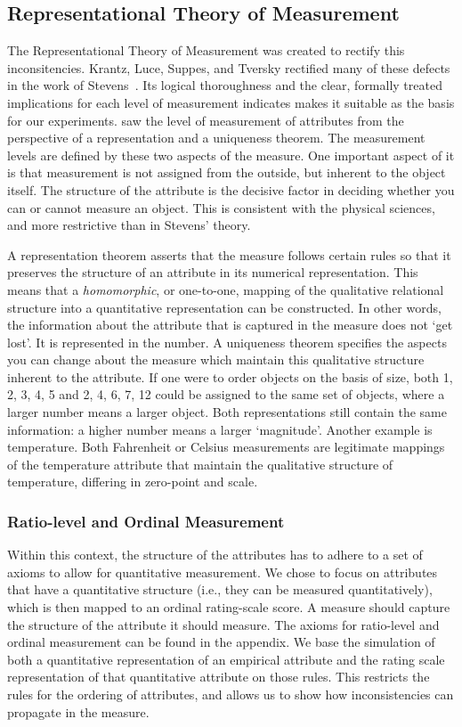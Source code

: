 \documentclass[titlepage, a4paper, 11pt]{article}
\begin{document}
\subsection{Representational Theory of Measurement}
The Representational Theory of Measurement was created to rectify this inconsitencies.
Krantz, Luce, Suppes, and Tversky rectified many of these defects in the work of Stevens~\citep{krantz_foundations_1971, luce_quantification_1997}. Its logical thoroughness and the clear, formally treated implications for each level of measurement indicates makes it suitable as the basis for our experiments. \citet{krantz_foundations_1971} saw the level of measurement of attributes from the perspective of a representation and a uniqueness theorem. The measurement levels are defined by these two aspects of the measure. One important aspect of it is that measurement is not assigned from the outside, but inherent to the object itself. The structure of the attribute is the decisive factor in deciding whether you can or cannot measure an object. This is consistent with the physical sciences, and more restrictive than in Stevens' theory.
 
A representation theorem asserts that the measure follows certain rules so that it preserves the structure of an attribute in its numerical representation. This means that a \textit{homomorphic}, or one-to-one, mapping of the qualitative relational structure into a quantitative representation can be constructed. In other words, the information about the attribute that is captured in the measure does not `get lost'. It is represented in the number. A uniqueness theorem specifies the aspects you can change about the measure which maintain this qualitative structure inherent to the attribute. If one were to order objects on the basis of size, both 1, 2, 3, 4, 5 and 2, 4, 6, 7, 12 could be assigned to the same set of objects, where a larger number means a larger object. Both representations still contain the same information: a higher number means a larger `magnitude'. Another example is temperature. Both Fahrenheit or Celsius measurements are legitimate mappings of the temperature attribute that maintain the qualitative structure of temperature, differing in zero-point and scale. 
 
\subsubsection{Ratio-level and Ordinal Measurement}
Within this context, the structure of the attributes has to adhere to a set of axioms to allow for quantitative measurement. We chose to focus on attributes that have a quantitative structure (i.e., they can be measured quantitatively), which is then mapped to an ordinal rating-scale score. A measure should capture the structure of the attribute it should measure. 
The axioms for ratio-level and ordinal measurement can be found in the appendix. We base the simulation of both a quantitative representation of an empirical attribute and the rating scale representation of that quantitative attribute on those rules. This restricts the rules for the ordering of attributes, and allows us to show how inconsistencies can propagate in the measure. 
\end{document}
